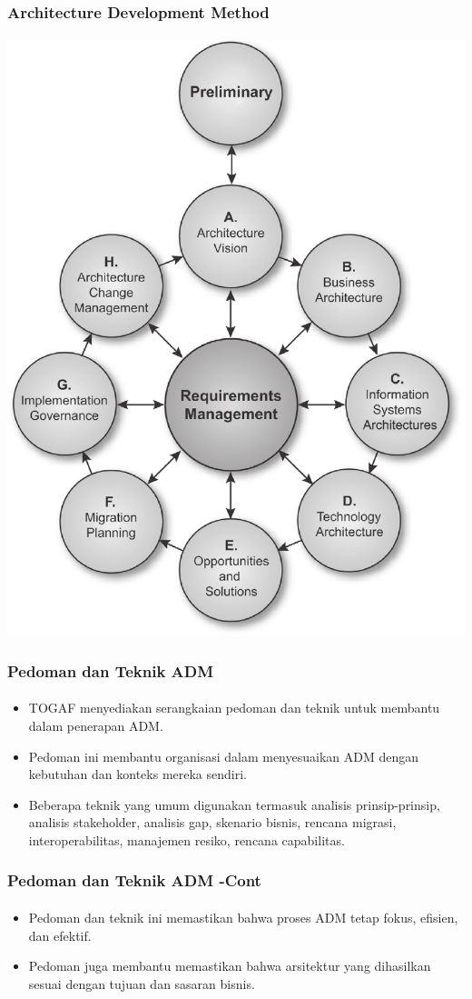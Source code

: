 \documentclass[aspectratio=169, table]{beamer}
\begin{document}
	{
		\begin{frame}
			\frametitle{Architecture Development Method}
			\framesubtitle{\hspace{1cm}}
			\begin{center}
				\includegraphics[width=.43\textwidth]{../figures/architecture_development_method}
			\end{center}
		\end{frame}
	}
	
	\begin{frame}
		\frametitle{Pedoman dan Teknik ADM}
		\framesubtitle{\hspace{1cm}}
		\begin{itemize}
			\item TOGAF menyediakan serangkaian pedoman dan teknik untuk membantu dalam penerapan ADM.
			\item Pedoman ini membantu organisasi dalam menyesuaikan ADM dengan kebutuhan dan konteks mereka sendiri.
			\item Beberapa teknik yang umum digunakan termasuk analisis prinsip-prinsip, analisis stakeholder, analisis gap, skenario bisnis, rencana migrasi, interoperabilitas, manajemen resiko, rencana capabilitas.
		\end{itemize}
	\end{frame}
	
	\begin{frame}
		\frametitle{Pedoman dan Teknik ADM -Cont}
		\framesubtitle{\hspace{1cm}}
		\begin{itemize}
			\item Pedoman dan teknik ini memastikan bahwa proses ADM tetap fokus, efisien, dan efektif.
			\item Pedoman juga membantu memastikan bahwa arsitektur yang dihasilkan sesuai dengan tujuan dan sasaran bisnis.
		\end{itemize}
	\end{frame}
	
\end{document}
